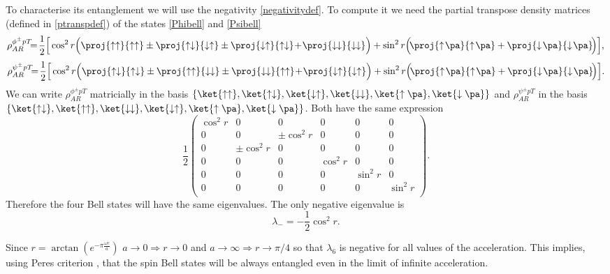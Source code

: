 To characterise its entanglement we will use the negativity \eqref{negativitydef}. To compute it we need the partial transpose density matrices (defined in \eqref{ptranspdef}) of the states \eqref{Phibell} and \eqref{Psibell}
\begin{equation}
\rho^{\phi^\pm pT}_{AR}\!\!\!=\!\frac12\Big[\cos^2 r\Big(\proj{\uparrow\uparrow}{\uparrow\uparrow}\pm\proj{\uparrow\downarrow}{\downarrow\uparrow}\pm\proj{\downarrow\uparrow}{\uparrow\downarrow}\!+\!\proj{\downarrow\downarrow}{\downarrow\downarrow}\Big)+\sin^2 r\Big(\!\proj{\uparrow\!\pa}{\uparrow\!\pa}+\proj{\downarrow\!\pa}{\downarrow\!\pa}\!\Big)\Big],
\end{equation}
\begin{equation}
\rho^{\psi^\pm pT}_{AR}\!\!\!=\!\frac12\Big[\cos^2 r\Big(\proj{\uparrow\downarrow}{\uparrow\downarrow}\pm\proj{\uparrow\uparrow}{\downarrow\downarrow}\pm\proj{\downarrow\downarrow}{\uparrow\uparrow}\!+\!\proj{\downarrow\uparrow}{\downarrow\uparrow}\Big)+\sin^2 r\Big(\!\proj{\uparrow\!\pa}{\uparrow\!\pa}+\proj{\downarrow\!\pa}{\downarrow\!\pa}\!\Big)\Big].
\end{equation}
We can write $\rho^{\phi^\pm pT}_{AR}$ matricially in the basis $\left\{\ket{\uparrow\uparrow},\ket{\uparrow\downarrow},\ket{\downarrow\uparrow},\ket{\downarrow\downarrow},\ket{\uparrow\pa},\ket{\downarrow\pa}\right\}$ and $\rho^{\psi^\pm pT}_{AR}$ in the basis $\left\{\ket{\uparrow\downarrow},\ket{\uparrow\uparrow},\ket{\downarrow\downarrow},\ket{\downarrow\uparrow},\ket{\uparrow\pa},\ket{\downarrow\pa}\right\}$. Both have the same expression
\begin{equation}
\frac12\left(\!\begin{array}{cccccc}
\cos^2 r & 0 &0 &0 & 0 & 0\\
0&0 &\pm\cos^2 r &0 & 0 & 0 \\
0  &\pm\cos^2 r  &0 &0 &0 &0 \\
0  & 0 &0 &\cos^2 r &0 &0 \\
0 & 0 &0&0& \sin^2 r &0 \\
0& 0& 0&0&0& \sin^2 r \\
\end{array}\!\right).
\end{equation}
Therefore the four Bell states will have the same eigenvalues. The only negative eigenvalue is
\begin{equation}
\lambda_-=-\frac12\cos^2r.
\end{equation}

Since $r=\arctan\left(e^{-\pi\frac{\omega c}{a}}\right)$ $a\rightarrow0\Rightarrow r\rightarrow 0$ and $a\rightarrow\infty\Rightarrow r\rightarrow \pi/4$ so that $\lambda_6$ is negative for all values of the acceleration. This implies, using Peres criterion \cite{PeresCriterion}, that the spin Bell states will be always entangled even in the limit of infinite acceleration.

